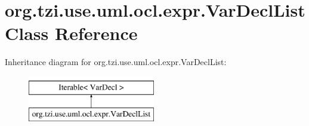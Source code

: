 \hypertarget{classorg_1_1tzi_1_1use_1_1uml_1_1ocl_1_1expr_1_1_var_decl_list}{\section{org.\-tzi.\-use.\-uml.\-ocl.\-expr.\-Var\-Decl\-List Class Reference}
\label{classorg_1_1tzi_1_1use_1_1uml_1_1ocl_1_1expr_1_1_var_decl_list}
}
Inheritance diagram for org.\-tzi.\-use.\-uml.\-ocl.\-expr.\-Var\-Decl\-List\-:\begin{figure}[H]
\begin{center}
\leavevmode
\includegraphics[height=2.000000cm]{classorg_1_1tzi_1_1use_1_1uml_1_1ocl_1_1expr_1_1_var_decl_list}
\end{center}
\end{figure}
